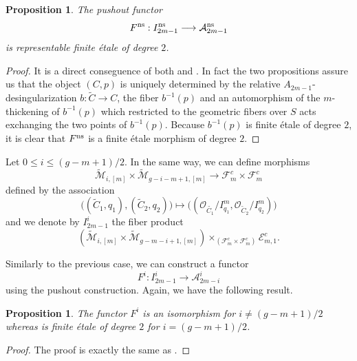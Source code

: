 \documentclass{alggeom}
\numberwithin{equation}{section}
\numberwithin{subsection}{section}
\newtheorem{proposition}[theorem]{Proposition}
\theoremstyle{definition}
\theoremstyle{remark}
\newcommand\cA{\mathcal{A}} \newcommand\cB{\mathcal{B}}
\newcommand\cE{\mathcal{E}} \newcommand\cF{\mathcal{F}}
\newcommand\cO{\mathcal{O}} \newcommand\cP{\mathcal{P}}
\newcommand{\Mtilde}{\widetilde{\mathcal M}}
\begin{document}
\begin{proposition}\label{prop:descr-an-odd-ns}
	The pushout functor
	$$F^{\rm ns}: I_{2m-1}^{\rm ns} \longrightarrow \cA_{2m-1}^{\rm ns}$$ 
	is representable finite \'etale of degree $2$.
\end{proposition}

\begin{proof}
	
	It is a direct conseguence of both  and . In fact  the two propositions assure us that the object $(C,p)$ is uniquely determined by the relative $A_{2m-1}$-desingularization $b:\widetilde{C}\rightarrow C$, the fiber $b^{-1}(p)$ and an automorphism of the $m$-thickening of $b^{-1}(p)$ which restricted to the geometric fibers over $S$ acts exchanging the two points of $b^{-1}(p)$. Because $b^{-1}(p)$ is finite \'etale of degree $2$, it is clear that $F^{\rm ns}$ is a finite \'etale morphism of degree $2$.
\end{proof}
Let $0\leq i\leq (g-m+1)/2$. In the same way, we can define morphisms 
$$  \Mtilde_{i,[m]}\times \Mtilde_{g-i-m+1,[m]} \longrightarrow \cF_{m}^c \times \cF_m^c$$ 
defined by the association $$\Big((\widetilde{C}_1,q_1),(\widetilde{C}_{2},q_{2})\Big) \mapsto \Big((\cO_{\widetilde{C_1}}/I_{q_1}^m,\cO_{\widetilde{C}_{2}}/I_{q_{2}}^m)\Big)$$
and we denote by $I_{2m-1}^{i}$ the fiber product $$(\Mtilde_{i,[m]}\times \Mtilde_{g-m-i+1,[m]})\times_{(\cF_{m}^c\times\cF_{m}^c)} \cE_{m,1}^c.$$

Similarly to the previous case, we can construct a functor 
$$ F^i: I_{2m-1}^i \longrightarrow \cA_{2m-i}^i$$ 
using the pushout construction. Again, we have the following result.

\begin{proposition}\label{prop:descr-an-odd-i}
	The functor $F^i$ is an isomorphism for $i \neq (g-m+1)/2$ whereas is finite \'etale of degree $2$ for $i = (g-m+1)/2$.
\end{proposition}

\begin{proof}
	The proof is exactly the same as .
\end{proof}






\end{document}
